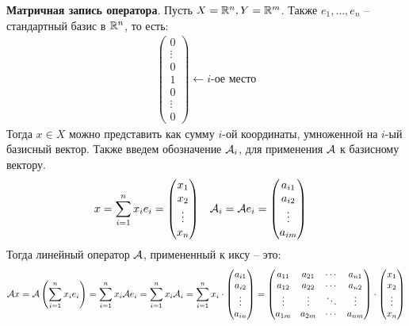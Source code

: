 \textbf{Матричная запись оператора}. Пусть $X = \mathbb{R}^n, Y = \mathbb{R}^m$. Также $e_1, \dots, e_n$ -- стандартный базис в $\mathbb{R}^n$, то есть:
\begin{gather*}
    \begin{pmatrix*}
        0 \\ 
        \vdots \\
        0 \\
        1 \\
        0 \\
        \vdots \\
        0
    \end{pmatrix*} \longleftarrow i\text{-ое место}
\end{gather*}
Тогда $x \in X$ можно представить как сумму $i$-ой координаты, умноженной на $i$-ый базисный вектор. 
Также введем обозначение $\mathcal{A}_i$, для применения $\mathcal{A}$ к базисному вектору. 
\begin{align*}
    x &= \sum\limits_{i=1}^n x_i e_i = \begin{pmatrix*}
        x_1 \\
        x_2 \\
        \vdots \\
        x_n
    \end{pmatrix*} & \A_i &= \A e_i = \begin{pmatrix*}
        a_{i1} \\
        a_{i2} \\
        \vdots \\
        a_{im}
    \end{pmatrix*}
\end{align*}
Тогда линейный оператор $\mathcal{A}$, примененный к иксу -- это:
\begin{gather*}
    \A x = \A \left( \sum\limits_{i=1}^n x_i e_i \right) = \sum\limits_{i=1}^n x_i \A e_i = \sum\limits_{i=1}^n x_i \A_i = \sum\limits_{i=1}^n x_i \cdot \begin{pmatrix*} 
        a_{i1} \\
        a_{i2} \\
        \vdots \\
        a_{in}
    \end{pmatrix*} =
    \begin{pmatrix*} 
        a_{11} & a_{21} & \cdots & a_{n1} \\
        a_{12} & a_{22} & \cdots & a_{n2} \\
        \vdots & \vdots & \ddots & \vdots \\
        a_{1m} & a_{2m} & \cdots & a_{nm} 
    \end{pmatrix*} \cdot \begin{pmatrix*}
        x_1 \\
        x_2 \\
        \vdots \\
        x_n
    \end{pmatrix*}
\end{gather*}